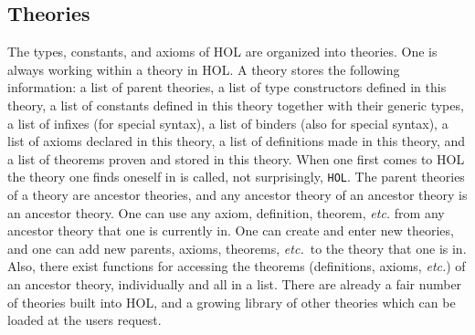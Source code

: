 \subsection{Theories}

The types, constants, and axioms of HOL are organized into theories.
One is always working within a theory in HOL.  A theory stores the
following information: a list of parent theories, a list of type
constructors defined in this theory, a list of constants defined in
this theory together with their generic types, a list of infixes (for
special syntax), a list of binders (also for special syntax), a list
of axioms declared in this theory, a list of definitions made in this
theory, and a list of theorems proven and stored in this theory.  When
one first comes to HOL the theory one finds oneself in is called, not
surprisingly, {\tt HOL}.  The parent theories of a theory are ancestor
theories, and any ancestor theory of an ancestor theory is an ancestor
theory.  One can use any axiom, definition, theorem, {\it etc.} from
any ancestor theory that one is currently in.  One can create and
enter new theories, and one can add new parents, axioms, theorems,
{\it etc.}~to the theory that one is in.  Also, there exist functions
for accessing the theorems (definitions, axioms, {\it etc.}) of an
ancestor theory, individually and all in a list.  There are already a
fair number of theories built into HOL, and a growing library of other
theories which can be loaded at the users request.


